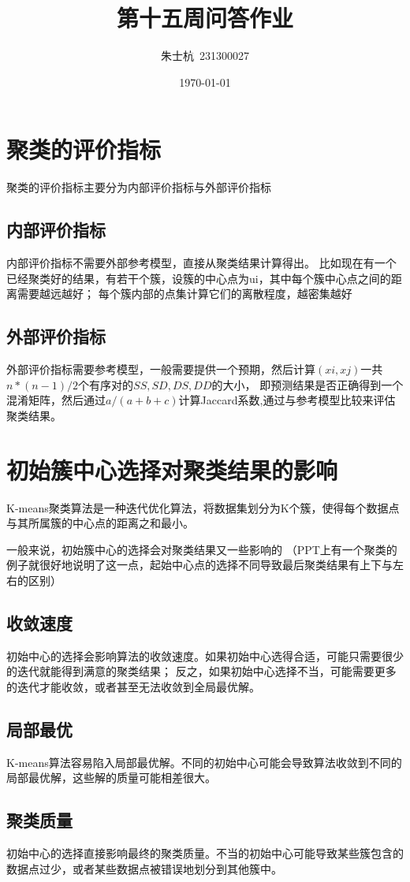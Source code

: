 \documentclass[10pt]{article}
\title{第十五周问答作业}
\author{朱士杭\ 231300027}
\date{\kaishu \today}
\begin{document}
	\maketitle
	
	\section{聚类的评价指标}
	聚类的评价指标主要分为内部评价指标与外部评价指标
	\subsection{内部评价指标}
	内部评价指标不需要外部参考模型，直接从聚类结果计算得出。
	比如现在有一个已经聚类好的结果，有若干个簇，设簇的中心点为ui，其中每个簇中心点之间的距离需要越远越好；
	每个簇内部的点集计算它们的离散程度，越密集越好
	\subsection{外部评价指标}
	外部评价指标需要参考模型，一般需要提供一个预期，然后计算$(xi,xj)$一共$n*(n-1)/2$个有序对的$SS,SD,DS,DD$的大小，
	即预测结果是否正确得到一个混淆矩阵，然后通过$a/(a+b+c)$计算Jaccard系数,通过与参考模型比较来评估聚类结果。
	
	\section{初始簇中心选择对聚类结果的影响}
	K-means聚类算法是一种迭代优化算法，将数据集划分为K个簇，使得每个数据点与其所属簇的中心点的距离之和最小。\par
	一般来说，初始簇中心的选择会对聚类结果又一些影响的
	（PPT上有一个聚类的例子就很好地说明了这一点，起始中心点的选择不同导致最后聚类结果有上下与左右的区别）\par
\subsection{收敛速度}初始中心的选择会影响算法的收敛速度。如果初始中心选得合适，可能只需要很少的迭代就能得到满意的聚类结果；
	反之，如果初始中心选择不当，可能需要更多的迭代才能收敛，或者甚至无法收敛到全局最优解。
	\subsection{局部最优}K-means算法容易陷入局部最优解。不同的初始中心可能会导致算法收敛到不同的局部最优解，这些解的质量可能相差很大。
	\subsection{聚类质量}初始中心的选择直接影响最终的聚类质量。不当的初始中心可能导致某些簇包含的数据点过少，或者某些数据点被错误地划分到其他簇中。
\end{document}
